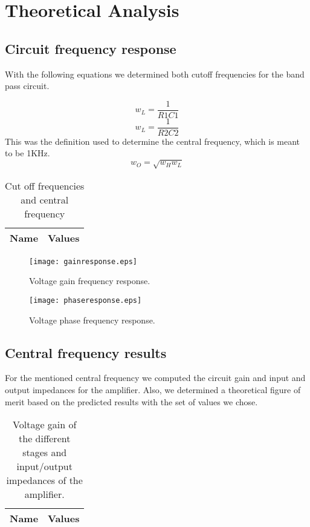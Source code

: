 \section{Theoretical Analysis}
\label{sec:analysis}
\subsection{Circuit frequency response}
With the following equations we determined both cutoff frequencies for the band pass circuit. 

\begin{equation}
w_L=\frac{1}{R1C1}
\end{equation}
\begin{equation}
w_L=\frac{1}{R2C2}
\end{equation}
This was the definition used to determine the central frequency, which is meant to be 1KHz.
\begin{equation}
w_O=\sqrt{w_{H}w_{L}}
\end{equation}

\begin{table}[h!]
  \centering
  \begin{tabular}{|l|r|}
    \hline    
    {\bf Name} & {\bf Values} \\ \hline
     
  \end{tabular}
  \caption{Cut off frequencies and central frequency}
  \label{tab:data}
\end{table}

\begin{figure}[!h] \centering
\texttt{[image: gainresponse.eps]}
\caption{Voltage gain frequency response.}
\label{fig:gainfreq}
\end{figure}

\begin{figure}[!h] \centering
\texttt{[image: phaseresponse.eps]}
\caption{Voltage phase frequency response.}
\label{fig:gainfreq}
\end{figure}

\subsection{Central frequency results}
For the mentioned central frequency we computed the circuit gain and input and output impedances for the amplifier. Also, we determined a theoretical figure of merit based on the predicted results with the set of values we chose.
\begin{table}[h!]
  \centering
  \begin{tabular}{|l|r|}
    \hline    
    {\bf Name} & {\bf Values} \\ \hline
     
  \end{tabular}
  \caption{Voltage gain of the different stages and input/output impedances of the amplifier.}
  \label{tab:data}
\end{table}
